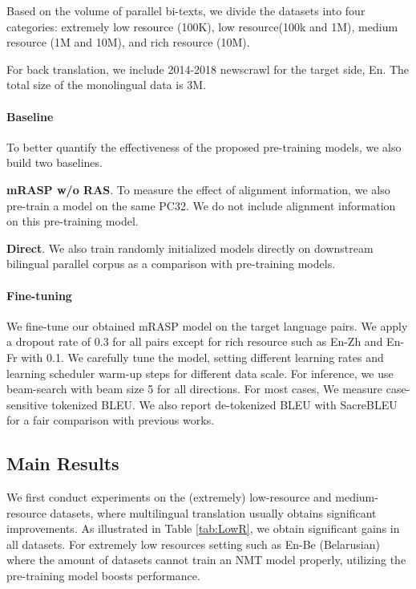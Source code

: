 \documentclass[11pt,a4paper]{article}
\newcommand{\method}{mRASP\xspace}
\newcommand{\baseline}{Direct}
\newcommand{\dataset}{PC32\xspace}
\begin{document}
Based on the volume of parallel bi-texts, we divide the datasets into four categories: extremely low resource (100K), low resource(100k and 1M), medium resource (1M and 10M), and rich resource (10M).

For back translation, we include 2014-2018 newscrawl for the target side, En. The total size of the monolingual data is 3M.

\paragraph{Baseline}

To better quantify the effectiveness of the proposed pre-training models, we also build two baselines.


\textbf{\method w/o RAS}. To measure the effect of alignment information, we also pre-train a model on the same \dataset. We do not include alignment information on this pre-training model.

\textbf{\baseline}.
We also train randomly initialized models directly on downstream bilingual parallel corpus as a comparison with pre-training models.





\paragraph{Fine-tuning}
We fine-tune our obtained \method model on the target language pairs. 
We apply a dropout rate of 0.3 for all pairs except for rich resource such as En-Zh and En-Fr with 0.1. We carefully tune the model, setting different learning rates and learning scheduler warm-up steps for different data scale. For inference, we use beam-search with beam size 5 for all directions.
For most cases, We measure case-sensitive tokenized BLEU. We also report de-tokenized BLEU with SacreBLEU \cite{DBLP:conf/wmt/Post18} for a fair comparison with previous works.


\subsection{Main Results}

We first conduct experiments on the (extremely) low-resource and medium-resource datasets, where multilingual translation usually obtains significant improvements. As illustrated in Table \ref{tab:LowR}, we obtain significant gains in all datasets. 
For extremely low resources setting such as En-Be (Belarusian) where the amount of datasets cannot train an NMT model properly, utilizing the pre-training model boosts performance.
\end{document}

